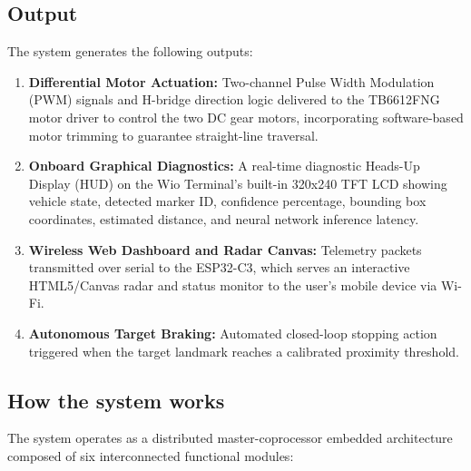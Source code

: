 \documentclass{article}
\begin{document}
\subsection{Output}

The system generates the following outputs:

\begin{enumerate}
    \item \textbf{Differential Motor Actuation:} Two-channel Pulse Width Modulation (PWM) signals and H-bridge direction logic delivered to the TB6612FNG motor driver to control the two DC gear motors, incorporating software-based motor trimming to guarantee straight-line traversal.
    \item \textbf{Onboard Graphical Diagnostics:} A real-time diagnostic Heads-Up Display (HUD) on the Wio Terminal's built-in 320x240 TFT LCD showing vehicle state, detected marker ID, confidence percentage, bounding box coordinates, estimated distance, and neural network inference latency.
    \item \textbf{Wireless Web Dashboard and Radar Canvas:} Telemetry packets transmitted over serial to the ESP32-C3, which serves an interactive HTML5/Canvas radar and status monitor to the user's mobile device via Wi-Fi.
    \item \textbf{Autonomous Target Braking:} Automated closed-loop stopping action triggered when the target landmark reaches a calibrated proximity threshold.
\end{enumerate}

\subsection{How the system works}

The system operates as a distributed master-coprocessor embedded architecture composed of six interconnected functional modules:
\end{document}
